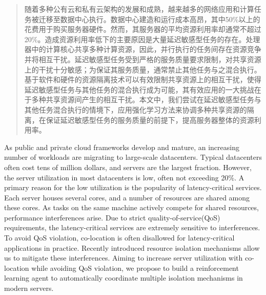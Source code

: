

\begin{abstract}
随着多种公有云和私有云架构的发展和成熟，越来越多的网络应用和计算任务被迁移至数据中心执行。数据中心建造和运行成本高昂，其中50\%以上的花费用于购买服务器硬件。然而，其服务器的平均资源利用率却通常不超过20\%。造成资源利用率低下的主要原因是大量延迟敏感型任务的存在。处理器中的计算核心共享多种计算资源，因此，并行执行的任务间存在资源竞争并将相互干扰。延迟敏感型任务受到严格的服务质量要求限制，对共享资源上的干扰十分敏感；为保证其服务质量，通常禁止其他任务与之混合执行。基于软件和硬件的资源隔离技术可以有效限制共享资源上的相互干扰，使得延迟敏感型任务与其他任务的混合执行成为可能，其有效应用的一大挑战在于多种共享资源间产生的相互干扰。本文中，我们尝试在延迟敏感型任务与其他任务混合执行的情境下，应用强化学习方法来协调多种共享资源的隔离，在保证延迟敏感型任务的服务质量的前提下，提高服务器整体的资源利用率。


\end{abstract}

\begin{englishabstract}

As public and private cloud frameworks develop and mature, an increasing number of workloads are migrating to large-scale datacenters. Typical datacenters often cost tens of million dollars, and servers are the largest fraction. However, the server utilization in most datacenters is low, often not exceeding 20\%. A primary reason for the low utilization is the popularity of latency-critical services. Each server houses several cores, and a number of resources are shared among these cores. As tasks on the same machine actively compete for shared resources, performance interferences arise. Due to strict quality-of-service(QoS) requirements, the latency-critical services are extremely sensitive to interferences. To avoid QoS violation, co-location is often disallowed for latency-critical applications in practice. Recently introduced resource isolation mechanisms allow us to mitigate these interferences.  Aiming to increase server utilization with co-location while avoiding QoS violation, we propose to build a reinforcement learning agent to automatically coordinate multiple isolation mechanisms in modern servers.

\end{englishabstract}

